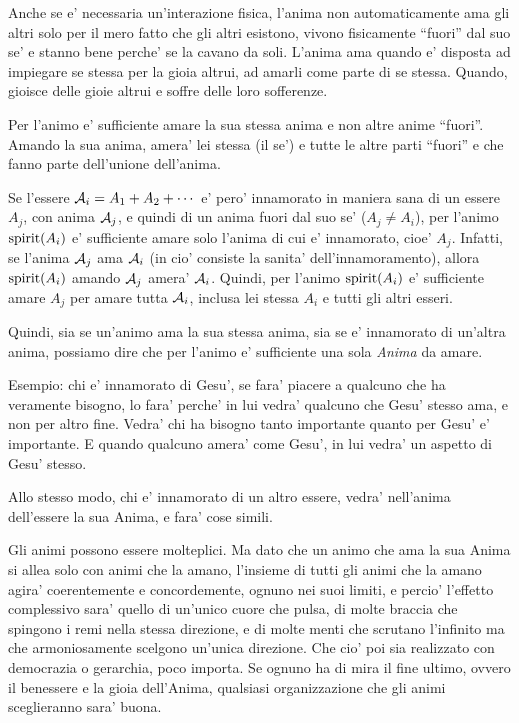 Anche se e' necessaria un'interazione fisica, l'anima non automaticamente ama gli altri solo per il mero fatto che gli altri esistono, vivono fisicamente ``fuori'' dal suo se' e stanno bene perche' se la cavano da soli. L'anima ama quando e' disposta ad impiegare se stessa per la gioia altrui, ad amarli come parte di se stessa. Quando, gioisce delle gioie altrui e soffre delle loro sofferenze. 

Per l'animo e' sufficiente amare la sua stessa anima e non altre anime ``fuori''. Amando la sua anima, amera' lei stessa (il se') e tutte le altre parti ``fuori'' e che fanno parte dell'unione dell'anima.

Se l'essere $\mathcal{A}_i=A_1+A_2+\cdots$ e' pero' innamorato in maniera sana di un essere $A_j$, con anima $\mathcal{A}_j$, e quindi di un anima fuori dal suo se' ($A_j\ne A_i$), per l'animo $\textrm{spirit}(A_i)$ e' sufficiente amare solo l'anima di cui e' innamorato, cioe' $A_j$. Infatti, se l'anima $\mathcal{A}_j$ ama $\mathcal{A}_i$ (in cio' consiste la sanita' dell'innamoramento), allora $\textrm{spirit}(A_i)$ amando $\mathcal{A}_j$ amera' $\mathcal{A}_i$.
Quindi, per l'animo $\textrm{spirit}(A_i)$ e' sufficiente amare $A_j$ per amare tutta $\mathcal{A}_i$, inclusa lei stessa $A_i$ e tutti gli altri esseri.

Quindi, sia se un'animo ama la sua stessa anima, sia se e' innamorato di un'altra anima, possiamo dire che per l'animo e' sufficiente una sola \emph{Anima} da amare.

Esempio: chi e' innamorato di Gesu', se fara' piacere a qualcuno che ha veramente bisogno, lo fara' perche' in lui vedra' qualcuno che Gesu' stesso ama, e non per altro fine. Vedra' chi ha bisogno tanto importante quanto per Gesu' e' importante. E quando qualcuno amera' come Gesu', in lui vedra' un aspetto di Gesu' stesso.

Allo stesso modo, chi e' innamorato di un altro essere, vedra' nell'anima dell'essere la sua Anima, e fara' cose simili.

Gli animi possono essere molteplici. Ma dato che un animo che ama la sua Anima si allea solo con animi che la amano, l'insieme di tutti gli animi che la amano agira' coerentemente e concordemente, ognuno nei suoi limiti, e percio' l'effetto complessivo sara' quello di un'unico cuore che pulsa, di molte braccia che spingono i remi nella stessa direzione, e di molte menti che scrutano l'infinito ma che armoniosamente scelgono un'unica direzione. Che cio' poi sia realizzato con democrazia o gerarchia, poco importa. Se ognuno ha di mira il fine ultimo, ovvero il benessere e la gioia dell'Anima, qualsiasi organizzazione che gli animi sceglieranno sara' buona.

